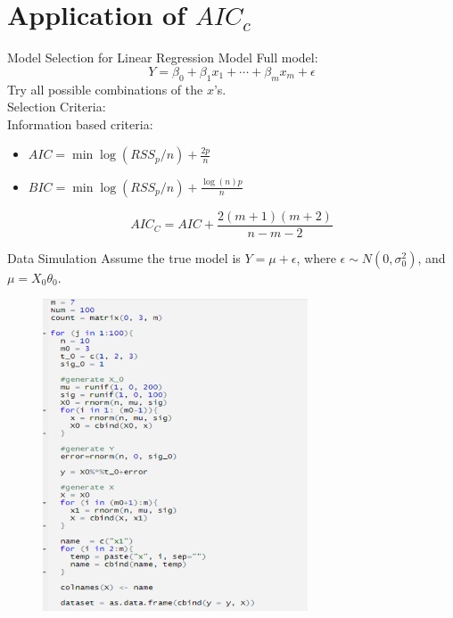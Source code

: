 \documentclass[11pt]{beamer}
\begin{document}
\section{Application of $AIC_c$}
\begin{frame}{Model Selection for Linear Regression Model}
Full model:
$$Y = \beta_0 +\beta_1x_1 +\cdots +\beta_mx_m+\epsilon$$
Try all possible combinations of the $x$'s.\\

Selection Criteria:\\
Information based criteria:\\
\begin{itemize}
    \item $AIC = \min \log(RSS_p/n)+\frac{2p}{n}$
    \item $BIC = \min \log(RSS_p/n)+\frac{\log(n)p}{n}$
\end{itemize}
$$AIC_C = AIC + \frac{2(m+1)(m+2)}{n-m-2}$$
\end{frame}

\begin{frame}{Data Simulation}
Assume the true model is
    $Y = \mu + \epsilon$,
where $\epsilon\sim N(0,\sigma_0^2)$, and $\mu = X_0\theta_0$.
\begin{figure}[htb]
        \centering
        \includegraphics[width=0.7\textwidth]{Picture1}
        \medskip
    \end{figure}

\end{frame}
\end{document}
